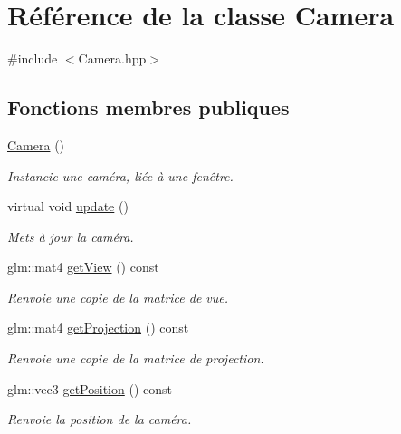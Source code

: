 \hypertarget{classCamera}{\section{Référence de la classe Camera}
\label{classCamera}
}


{\ttfamily \#include $<$Camera.\+hpp$>$}

\subsection*{Fonctions membres publiques}
\begin{DoxyCompactItemize}
\item 
\hyperlink{classCamera_a01f94c3543f56ede7af49dc778f19331}{Camera} ()
\begin{DoxyCompactList}\small\item\em Instancie une caméra, liée à une fenêtre. \end{DoxyCompactList}\item 
virtual void \hyperlink{classCamera_a42cda7239981a5618660d04bd5893556}{update} ()
\begin{DoxyCompactList}\small\item\em Mets à jour la caméra. \end{DoxyCompactList}\item 
glm\+::mat4 \hyperlink{classCamera_af16af4b8b0ff1e4381359ecd2075092d}{get\+View} () const 
\begin{DoxyCompactList}\small\item\em Renvoie une copie de la matrice de vue. \end{DoxyCompactList}\item 
glm\+::mat4 \hyperlink{classCamera_aa3bc85ea7125f9051a45cb522dee71ff}{get\+Projection} () const 
\begin{DoxyCompactList}\small\item\em Renvoie une copie de la matrice de projection. \end{DoxyCompactList}\item 
glm\+::vec3 \hyperlink{classCamera_ad741cb975e8ea88698ed1b0216a0bb82}{get\+Position} () const 
\begin{DoxyCompactList}\small\item\em Renvoie la position de la caméra. \end{DoxyCompactList}\end{DoxyCompactItemize}
